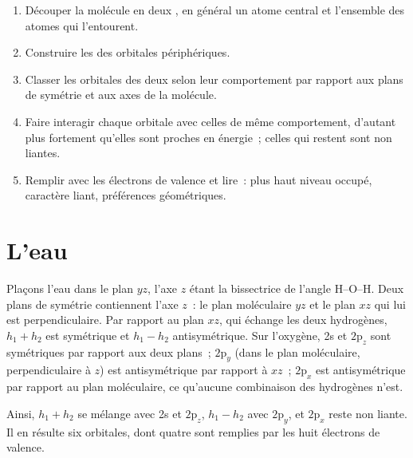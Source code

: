 \begin{method}\label{met:b2:fragment-orbitals:fragment-diagram}
\begin{enumerate}
  \item Découper la molécule en deux , en général un atome central et l'ensemble
        des atomes qui l'entourent.
  \item Construire les  des orbitales périphériques.
  \item Classer les orbitales des deux  selon leur comportement par rapport aux plans
        de symétrie et aux axes de la molécule.
  \item Faire interagir chaque orbitale avec celles de même comportement, d'autant plus fortement
        qu'elles sont proches en énergie~; celles qui restent sont non liantes.
  \item Remplir avec les électrons de valence et lire~: plus haut niveau occupé,
        caractère liant, préférences géométriques.
\end{enumerate}
\end{method}

\section{L'eau}

Plaçons l'eau dans le plan $yz$, l'axe $z$ étant la bissectrice de l'angle H--O--H. Deux
plans de symétrie contiennent l'axe $z$~: le plan moléculaire $yz$ et le plan $xz$
qui lui est perpendiculaire. Par rapport au plan $xz$, qui échange les deux
hydrogènes, $h_1 + h_2$ est symétrique et $h_1 - h_2$ antisymétrique. Sur l'oxygène, 2s et
$2\mathrm p_z$ sont symétriques par rapport aux deux plans~; $2\mathrm p_y$ (dans le
plan moléculaire, perpendiculaire à $z$) est antisymétrique par rapport à $xz$~;
$2\mathrm p_x$ est antisymétrique par rapport au plan moléculaire, ce qu'aucune
combinaison des hydrogènes n'est.

Ainsi, $h_1 + h_2$ se mélange avec 2s et $2\mathrm p_z$, $h_1 - h_2$ avec $2\mathrm p_y$, et
$2\mathrm p_x$ reste non liante. Il en résulte six orbitales, dont quatre sont remplies par les huit
électrons de valence.

